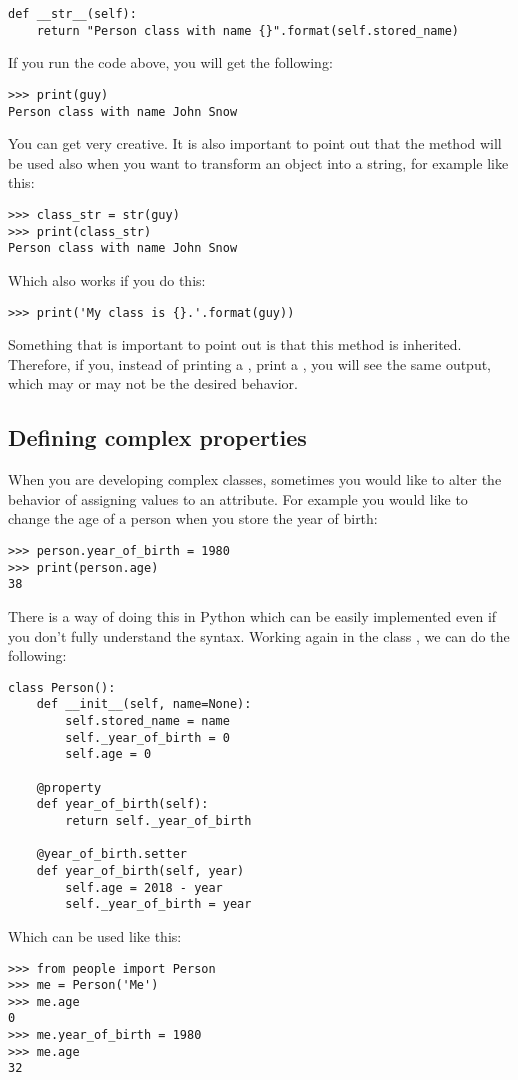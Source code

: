 \begin{verbatim}
def __str__(self):
    return "Person class with name {}".format(self.stored_name)
\end{verbatim}

If you run the code above, you will get the following:
\begin{verbatim}
>>> print(guy)
Person class with name John Snow
\end{verbatim}

You can get very creative. It is also important to point out that the method  will be used also when you want to transform an object into a string, for example like this:

\begin{verbatim}
>>> class_str = str(guy)
>>> print(class_str)
Person class with name John Snow
\end{verbatim}

Which also works if you do this:

\begin{verbatim}
>>> print('My class is {}.'.format(guy))
\end{verbatim}

Something that is important to point out is that this method is inherited. Therefore, if you, instead of printing a , print a , you will see the same output, which may or may not be the desired behavior.

\subsection{Defining complex properties}
When you are developing complex classes, sometimes you would like to alter the behavior of assigning values to an attribute. For example you would like to change the age of a person when you store the year of birth:
\begin{verbatim}
>>> person.year_of_birth = 1980
>>> print(person.age)
38
\end{verbatim}

There is a way of doing this in Python which can be easily implemented even if you don't fully understand the syntax. Working again in the class , we can do the following:
\begin{verbatim}
class Person():
    def __init__(self, name=None):
        self.stored_name = name
        self._year_of_birth = 0
        self.age = 0

    @property
    def year_of_birth(self):
        return self._year_of_birth
        
    @year_of_birth.setter
    def year_of_birth(self, year)
        self.age = 2018 - year
        self._year_of_birth = year
\end{verbatim}
Which can be used like this:
\begin{verbatim}
>>> from people import Person
>>> me = Person('Me')
>>> me.age
0
>>> me.year_of_birth = 1980
>>> me.age
32
\end{verbatim}

